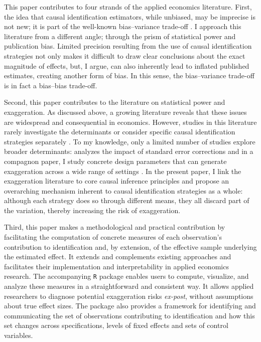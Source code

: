			This paper contributes to four strands of the applied economics literature. First, the idea that causal identification estimators, while unbiased, may be imprecise is not new; it is part of the well-known bias–variance trade-off \citep{imbens_optimal_2012, deaton_understanding_2018, hernan_causal_2020, ravallion_should_2020a}. I approach this literature from a different angle; through the prism of statistical power and publication bias. Limited precision resulting from the use of causal identification strategies not only makes it difficult to draw clear conclusions about the exact magnitude of effects, but, I argue, can also inherently lead to inflated published estimates, creating another form of bias. In this sense, the bias–variance trade-off is in fact a bias–bias trade-off.
			
			 Second, this paper contributes to the literature on statistical power and exaggeration. As discussed above, a growing literature reveals that these issues are widespread and consequential in economics. However, studies in this literature rarely investigate the determinants or consider specific causal identification strategies separately \citep{ioannidis_power_2017, schellEvaluatingMethodsEstimate2018, ferraro_feature_2020, black_simulated_2022, stommes_reliability_2023, arel-bundock_quantitative_2024}. To my knowledge, only a limited number of studies explore broader determinants: \citet{vu_standard_2025} analyzes the impact of standard error corrections and in a compagnon paper, I study concrete design parameters that can generate exaggeration across a wide range of settings \citep{bagilet_accurate_2023}. In the present paper, I link the exaggeration literature to core causal inference principles and propose an overarching mechanism inherent to causal identification strategies as a whole: although each strategy does so through different means, they all discard part of the variation, thereby increasing the risk of exaggeration.
			
			Third, this paper makes a methodological and practical contribution by facilitating the computation of concrete measures of each observation's contribution to identification and, by extension, of the effective sample underlying the estimated effect. It extends and complements existing approaches \citep{angrist_mostly_2009, aronow_does_2016} and facilitates their implementation and interpretability in applied economics research. The accompanying \verb?R? package enables users to compute, visualize, and analyze these measures in a straightforward and consistent way. It allows applied researchers to diagnose potential exaggeration risks \textit{ex-post}, without assumptions about true effect sizes. The package also provides a framework for identifying and communicating the set of observations contributing to identification and how this set changes across specifications, levels of fixed effects and sets of control variables.
			
